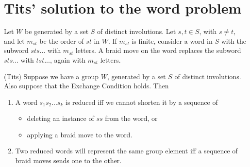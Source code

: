 \documentclass[12pt]{article}
\begin{document}
\section{Tits' solution to the word problem}

\begin{definition}
    Let $W$ be generated by a set $S$ of distinct involutions. Let $s,t\in S$, with $s\neq t$, and let $m_{st}$ be the order of $st$ in $W$. If $m_{st}$ is finite, consider a word in $S$ with the subword $sts...$ with $m_{st}$ letters. A braid move on the word replaces the subword $sts...$ with $tst...$, again with $m_{st}$ letters. 
\end{definition}

\begin{theorem}
    (Tits) Suppose we have a group $W$, generated by a set $S$ of distinct involutions. Also suppose that the Exchange Condition holds. Then
    \begin{enumerate}
        \item A word $s_1s_2...s_k$ is reduced iff we cannot shorten it by a sequence of 
        \begin{itemize}
            \item deleting an instance of $ss$ from the word, or
            \item applying a braid move to the word.
        \end{itemize}
        \item Two reduced words will represent the same group element iff a sequence of braid moves sends one to the other.
    \end{enumerate}
\end{theorem}
\end{document}
